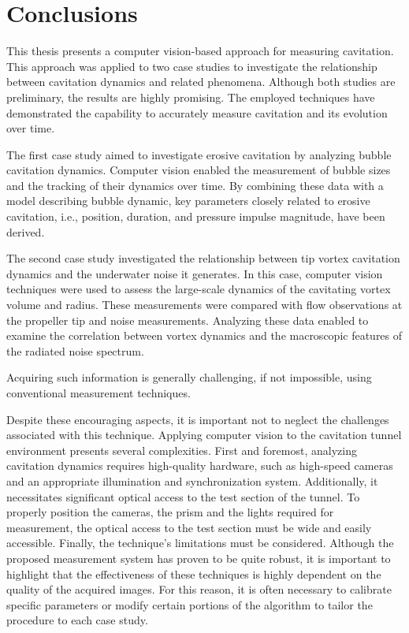 \chapter{Conclusions}
\label{chap:chapter7}

This thesis presents a computer vision-based approach for measuring cavitation. This approach was applied to two case studies to investigate the relationship between cavitation dynamics and related phenomena. 
Although both studies are preliminary, the results are highly promising. The employed techniques have demonstrated the capability to accurately measure cavitation and its evolution over time.

The first case study aimed to investigate erosive cavitation by analyzing bubble cavitation dynamics.
Computer vision enabled the measurement of bubble sizes and the tracking of their dynamics over time.
By combining these data with a model describing bubble dynamic, key parameters closely related to erosive cavitation, i.e., position, duration, and pressure impulse magnitude, have been derived.

The second case study investigated the relationship between tip vortex cavitation dynamics and the underwater noise it generates. In this case, computer vision techniques were used to assess the large-scale dynamics of the cavitating vortex volume and radius.
These measurements were compared with flow observations at the propeller tip and noise measurements. 
Analyzing these data enabled to examine the correlation between vortex dynamics and the macroscopic features of the radiated noise spectrum.

Acquiring such information is generally challenging, if not impossible, using conventional measurement techniques.

Despite these encouraging aspects, it is important not to neglect the challenges associated with this technique. Applying computer vision to the cavitation tunnel environment presents several complexities. First and foremost, analyzing cavitation dynamics requires high-quality hardware, such as high-speed cameras and an appropriate illumination and synchronization system. Additionally, it necessitates significant optical access to the test section of the tunnel.
To properly position the cameras, the prism and the lights required for measurement, the optical access to the test section must be wide and easily accessible.
Finally, the technique's limitations must be considered. Although the proposed measurement system has proven to be quite robust, it is important to highlight that the effectiveness of these techniques is highly dependent on the quality of the acquired images. For this reason, it is often necessary to calibrate specific parameters or modify certain portions of the algorithm to tailor the procedure to each case study.

